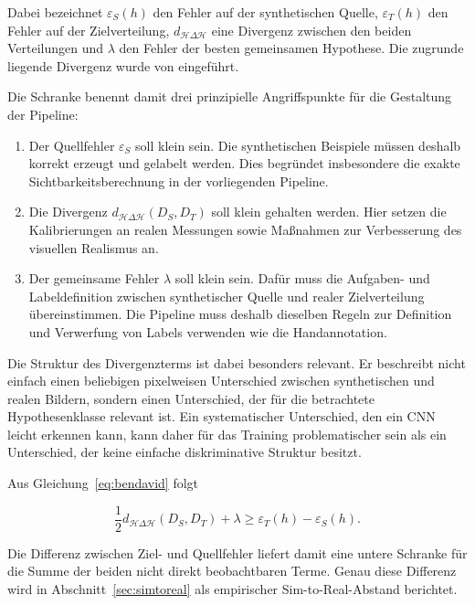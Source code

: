 Dabei bezeichnet $\varepsilon_S(h)$ den Fehler auf der synthetischen Quelle, $\varepsilon_T(h)$ den Fehler auf der Zielverteilung, $d_{\mathcal{H}\Delta\mathcal{H}}$ eine Divergenz zwischen den beiden Verteilungen und $\lambda$ den Fehler der besten gemeinsamen Hypothese. Die zugrunde liegende Divergenz wurde von \textcite{bendavid2007} eingeführt.

Die Schranke benennt damit drei prinzipielle Angriffspunkte für die Gestaltung der Pipeline:

\begin{enumerate}
\item Der Quellfehler $\varepsilon_S$ soll klein sein. Die synthetischen Beispiele müssen deshalb korrekt erzeugt und gelabelt werden. Dies begründet insbesondere die exakte Sichtbarkeitsberechnung in der vorliegenden Pipeline.

\item Die Divergenz $d_{\mathcal{H}\Delta\mathcal{H}}(D_S,D_T)$ soll klein gehalten werden. Hier setzen die Kalibrierungen an realen Messungen sowie Maßnahmen zur Verbesserung des visuellen Realismus an.

\item Der gemeinsame Fehler $\lambda$ soll klein sein. Dafür muss die Aufgaben- und Labeldefinition zwischen synthetischer Quelle und realer Zielverteilung übereinstimmen. Die Pipeline muss deshalb dieselben Regeln zur Definition und Verwerfung von Labels verwenden wie die Handannotation.
\end{enumerate}

Die Struktur des Divergenzterms ist dabei besonders relevant. Er beschreibt nicht einfach einen beliebigen pixelweisen Unterschied zwischen synthetischen und realen Bildern, sondern einen Unterschied, der für die betrachtete Hypothesenklasse relevant ist. Ein systematischer Unterschied, den ein CNN leicht erkennen kann, kann daher für das Training problematischer sein als ein Unterschied, der keine einfache diskriminative Struktur besitzt.


Aus Gleichung~\eqref{eq:bendavid} folgt

\begin{equation}
\frac{1}{2}
d_{\mathcal{H}\Delta\mathcal{H}}(D_S,D_T)
+
\lambda
\geq
\varepsilon_T(h)-\varepsilon_S(h).
\label{eq:bendavid-diff}
\end{equation}

Die Differenz zwischen Ziel- und Quellfehler liefert damit eine untere Schranke für die Summe der beiden nicht direkt beobachtbaren Terme. Genau diese Differenz wird in Abschnitt~\ref{sec:simtoreal} als empirischer Sim-to-Real-Abstand berichtet.

